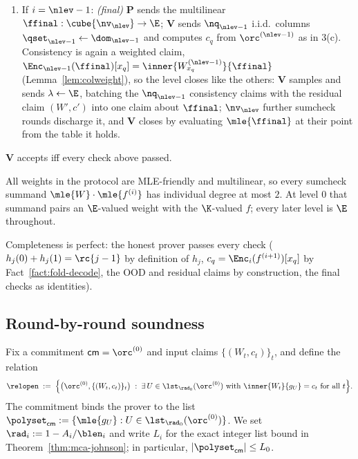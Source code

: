 \begin{protocol}
\begin{enumerate}[itemsep=0.5pt,topsep=2pt]
\item If $i = \nlev - 1$: \emph{(final)} $\mathbf{P}$ sends the multilinear $\ffinal : \cube{\nv_\nlev} \to \E$; $\mathbf{V}$ sends $\nq_{\nlev-1}$ i.i.d.\ columns $\qset_{\nlev-1} \leftarrow \dom_{\nlev-1}$ and computes $c_q$ from $\orc^{(\nlev-1)}$ as in 3(c). Consistency is again a weighted claim, $\Enc_{\nlev-1}(\ffinal)[x_q] = \inner{W^{(\nlev-1)}_{x_q}}{\ffinal}$ (Lemma~\ref{lem:colweight}), so the level closes like the others: $\mathbf{V}$ samples and sends $\lambda \leftarrow \E$, batching the $\nq_{\nlev-1}$ consistency claims with the residual claim $(W', c')$ into one claim about $\ffinal$; $\nv_\nlev$ further sumcheck rounds discharge it, and $\mathbf{V}$ closes by evaluating $\mle{\ffinal}$ at their point from the table it holds.
\end{enumerate}
$\mathbf{V}$ accepts iff every check above passed.
\end{protocol}

All weights in the protocol are MLE-friendly and multilinear, so every sumcheck summand $\mle{W} \cdot \mle{f^{(i)}}$ has individual degree at most $2$. At level $0$ that summand pairs an $\E$-valued weight with the $\K$-valued $f$; every later level is $\E$ throughout.

Completeness is perfect: the honest prover passes every check ($h_j(0) + h_j(1) = \rc{j-1}$ by definition of $h_j$, $c_q = \Enc_i(f^{(i+1)})[x_q]$ by Fact~\ref{fact:fold-decode}, the OOD and residual claims by construction, the final checks as identities).

\subsection{Round-by-round soundness}\label{sec:soundness}

Fix a commitment $\mathsf{cm} = \orc^{(0)}$ and input claims $\{(W_t, c_t)\}_t$, and define the relation
\[
\relopen \;:=\; \Bigl\{ \bigl(\orc^{(0)}, \{(W_t, c_t)\}_t\bigr) \;:\; \exists\, U \in \lst_{\rad_0}(\orc^{(0)}) \text{ with } \inner{W_t}{g_U} = c_t \text{ for all } t \Bigr\}.
\]
The commitment binds the prover to the list $\polyset_{\mathsf{cm}} := \{\mle{g_U} : U \in \lst_{\rad_0}(\orc^{(0)})\}$. We set $\rad_i:=1-A_i/\blen_i$ and write $L_i$ for the exact integer list bound in Theorem~\ref{thm:mca-johnson}; in particular, $|\polyset_{\mathsf{cm}}|\le L_0$.

